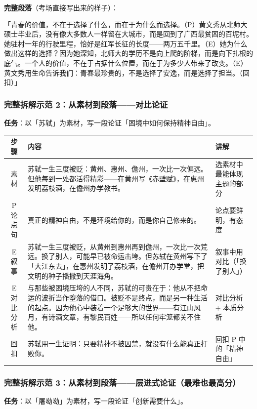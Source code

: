\textbf{完整段落}（考场直接写出来的样子）：

「青春的价值，不在于选择了什么，而在于为什么而选择。（P）黄文秀从北师大硕士毕业后，没有像大多数人一样留在大城市，而是回到了广西最贫困的百坭村。她驻村一年的行驶里程，恰好是红军长征的长度——两万五千里。（E）她为什么做出这样的选择？因为她深知，北师大的学历不是向上爬的阶梯，而是向下扎根的底气。一个人的价值，不在于占据什么位置，而在于为多少人带来了改变。（E）黄文秀用生命告诉我们：青春最珍贵的，不是选择了安逸，而是选择了担当。（回扣）」

\subsubsection{完整拆解示范 2：从素材到段落——对比论证}

\textbf{任务}：以「苏轼」为素材，写一段论证「困境中如何保持精神自由」。

\begin{center}
\begin{tabular}{c|l|l}
\textbf{步骤} & \textbf{内容} & \textbf{讲解} \\ \hline
素材 & 苏轼一生三度被贬：黄州、惠州、儋州，一次比一次偏远。但他每到一处都活得精彩——在黄州写《赤壁赋》，在惠州发明荔枝酒，在儋州办学教书。 & 选素材中最能体现主题的部分 \\
P 论点句 & 真正的精神自由，不是环境给你的，而是你自己修来的。 & 论点要鲜明，有态度 \\
E 叙事 & 苏轼一生三度被贬，从黄州到惠州再到儋州，一次比一次荒远。换了别人，可能早已被命运击垮。但苏轼在黄州写下了「大江东去」，在惠州发明了荔枝酒，在儋州开办学堂，把文明的种子播撒到天涯海角。 & 叙事中用对比（「换了别人」） \\
E 对比分析 & 与那些被困境压垮的人不同，苏轼的可贵在于：他从不把命运的波折当作堕落的借口。被贬不是终点，而是另一种生活的起点。因为他心中装着一个足够大的世界——有江山风月，有诗酒文章，有黎民百姓——所以任何牢笼都关不住他。 & 对比分析 + 本质分析 \\
回扣 & 苏轼用一生证明：只要精神不被囚禁，就没有什么能真正打败你。 & 回扣 P 中的「精神自由」 \\
\end{tabular}
\end{center}

\subsubsection{完整拆解示范 3：从素材到段落——层进式论证（最难也最高分）}

\textbf{任务}：以「屠呦呦」为素材，写一段论证「创新需要什么」。

